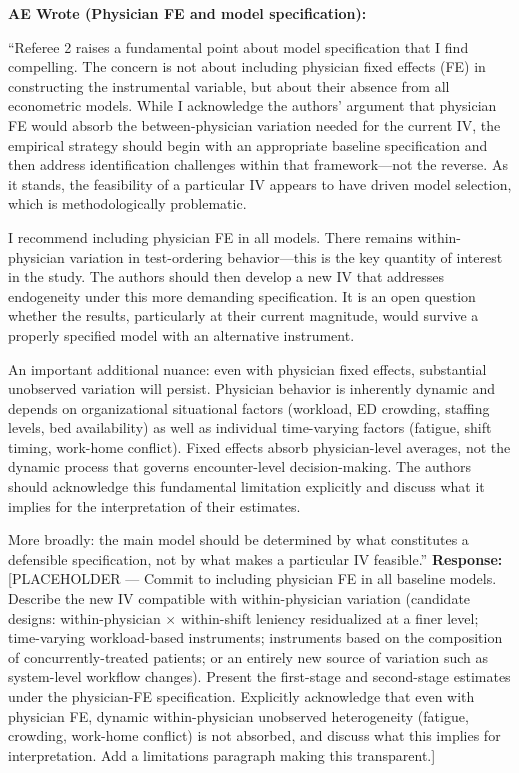 \documentclass[11pt]{article}
\newenvironment{quote2}
{ \bigskip
\noindent
         \small\em
         \baselineskip=14pt
}
\newcommand{\1}{\hbox{\rm 1\kern-.35em 1}}
\begin{document}
\begin{quote2}
\textbf{AE Wrote (Physician FE and model specification):}

\noindent ``Referee 2 raises a fundamental point about model specification that I find compelling. The concern is not about including physician fixed effects (FE) in constructing the instrumental variable, but about their absence from all econometric models. While I acknowledge the authors' argument that physician FE would absorb the between-physician variation needed for the current IV, the empirical strategy should begin with an appropriate baseline specification and then address identification challenges within that framework---not the reverse. As it stands, the feasibility of a particular IV appears to have driven model selection, which is methodologically problematic.

I recommend including physician FE in all models. There remains within-physician variation in test-ordering behavior---this is the key quantity of interest in the study. The authors should then develop a new IV that addresses endogeneity under this more demanding specification. It is an open question whether the results, particularly at their current magnitude, would survive a properly specified model with an alternative instrument.

An important additional nuance: even with physician fixed effects, substantial unobserved variation will persist. Physician behavior is inherently dynamic and depends on organizational situational factors (workload, ED crowding, staffing levels, bed availability) as well as individual time-varying factors (fatigue, shift timing, work-home conflict). Fixed effects absorb physician-level averages, not the dynamic process that governs encounter-level decision-making. The authors should acknowledge this fundamental limitation explicitly and discuss what it implies for the interpretation of their estimates.

More broadly: the main model should be determined by what constitutes a defensible specification, not by what makes a particular IV feasible.''
\end{quote2}

\noindent\textbf{Response:} \color{blue}[PLACEHOLDER --- Commit to including physician FE in all baseline models. Describe the new IV compatible with within-physician variation (candidate designs: within-physician $\times$ within-shift leniency residualized at a finer level; time-varying workload-based instruments; instruments based on the composition of concurrently-treated patients; or an entirely new source of variation such as system-level workflow changes). Present the first-stage and second-stage estimates under the physician-FE specification. Explicitly acknowledge that even with physician FE, dynamic within-physician unobserved heterogeneity (fatigue, crowding, work-home conflict) is not absorbed, and discuss what this implies for interpretation. Add a limitations paragraph making this transparent.]
\color{black}
\end{document}
